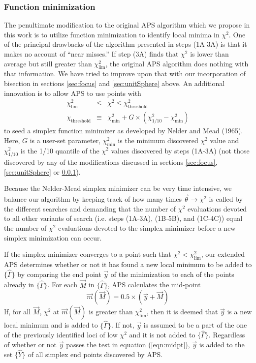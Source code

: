 \documentclass[useAMS,usenatbib]{aastex}
\begin{document}
\subsubsection{Function minimization}
\label{sec:simplex}

The penultimate modification to the original APS algorithm which we propose in this
work is to utilize function minimization to identify local minima in $\chi^2$.
One of the principal drawbacks of the algorithm presented in steps (1A-3A) is
that it makes no account of ``near misses.''  If step (3A) finds that $\chi^2$
is lower than average but still greater than $\chi^2_\text{lim}$, the original
APS algorithm does nothing with that information.  We have tried to improve upon
that with our incorporation of bisection in sections \ref{sec:focus} and
\ref{sec:unitSphere} above.  An additional innovation is to allow APS to use points
with 
\begin{eqnarray}
\chi^2_\text{lim}&\le&\chi^2\le\chi^2_\text{threshold}\label{eqn:simplexCriterion}\\
\chi_\text{threshold}&\equiv&\chi^2_\text{min}+G\times(\chi^2_{1/10}-\chi^2_\text{min})
\label{eqn:threshold}
\end{eqnarray}
to seed a simplex function minimizer as developed by Nelder and Mead (1965).
Here, $G$ is a user-set parameter, $\chi^2_\text{min}$ is the minimum discovered
$\chi^2$ value and $\chi^2_{1/10}$ is the 1/10 quantile of the $\chi^2$ values
discovered by steps (1A-3A) (not those discovered by any of the modifications
discussed in sections \ref{sec:focus}, \ref{sec:unitSphere} or
\ref{sec:simplex}).

Because the Nelder-Mead simplex minimizer can be very time intensive, we balance our
algorithm by keeping track of how many times $\vec{\theta}\rightarrow\chi^2$
is called by the different searches and
demanding that the number of $\chi^2$ evaluations devoted to all
other variants of search (i.e. steps (1A-3A), (1B-5B), and (1C-4C)) equal the number of
$\chi^2$ evaluations devoted to the simplex minimizer before a new simplex
minimization can occur.

If the simplex minimizer converges to a point such that
$\chi^2<\chi^2_\text{lim}$, our extended APS determines whether or not it
has found a new local minimum to be added to $\{\hat{\Gamma}\}$ by comparing the end
point $\vec{y}$ of the minimization to each of the points already in
$\{\hat{\Gamma}\}$.  For each $\vec{M}$ in $\{\hat{\Gamma}\}$, APS calculates the mid-point
\begin{equation}
\label{eqn:midpt}
\vec{m}(\vec{M})=0.5\times\left(\vec{y}+\vec{M}\right)
\end{equation}
If, for all $\vec{M}$, 
$\chi^2$ at $\vec{m}(\vec{M})$ is greater
than $\chi^2_\text{lim}$, then it is deemed that $\vec{y}$ is a new local
minimum and is added to $\{\hat{\Gamma}\}$.  If not, $\vec{y}$ is assumed to be a
part of the one of the previously identified loci of low $\chi^2$ and it is not
added to $\{\hat{\Gamma}\}$.  Regardless of whether or not $\vec{y}$ passes the test in
equation (\ref{eqn:midpt}), $\vec{y}$ is added to the set $\{\hat{Y}\}$ of all
simplex end points discovered by APS.
\end{document}
